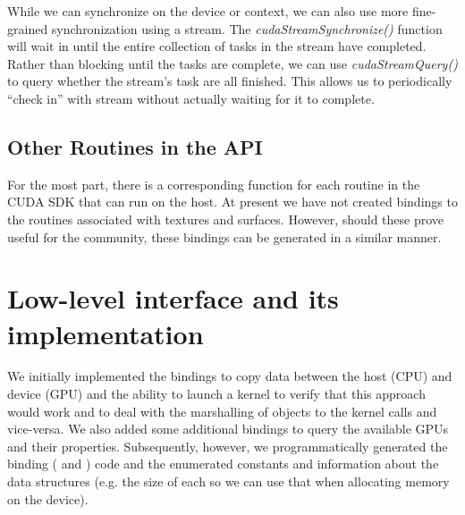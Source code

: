 \documentclass[article]{jss}
\newcommand{\note}[1]{\textbf{\textcolor{red}{#1}}}
\def\C{\proglang{C}}
\def\R{\proglang{R}}
\def\Rfunc#1{\textsl{#1()}}
\begin{document}
While we can synchronize on the device or context, we can also use
more fine-grained synchronization using a stream. The
\Rfunc{cudaStreamSynchronize} function will wait in \R{} until the
entire collection of tasks in the stream have completed.  Rather than
blocking until the tasks are complete, we can use
\Rfunc{cudaStreamQuery} to query whether the stream's task are all
finished.  This allows us to periodically ``check in'' with stream
without actually waiting for it to complete.



\subsection{Other Routines in the API}

For the most part, there is a corresponding \R{} function for 
each routine in the CUDA SDK that can run on the host. At present 
we have not created bindings to the routines associated with textures
and surfaces. However, should these prove useful for the community, 
these bindings can be generated in a similar manner.







\section{Low-level interface and its implementation}
We initially implemented the bindings to copy data between the host
(CPU) and device (GPU) and the ability to launch a kernel to verify
that this approach would work and to deal with the marshalling of \R{}
objects to the kernel calls and vice-versa.  We also added some
additional bindings to query the available GPUs and their properties.
Subsequently, however, we programmatically generated the binding (\R{}
and \C) code and the enumerated constants and information about the
data structures (e.g. the size of each so we can use that when
allocating memory on the device).  
\end{document}
